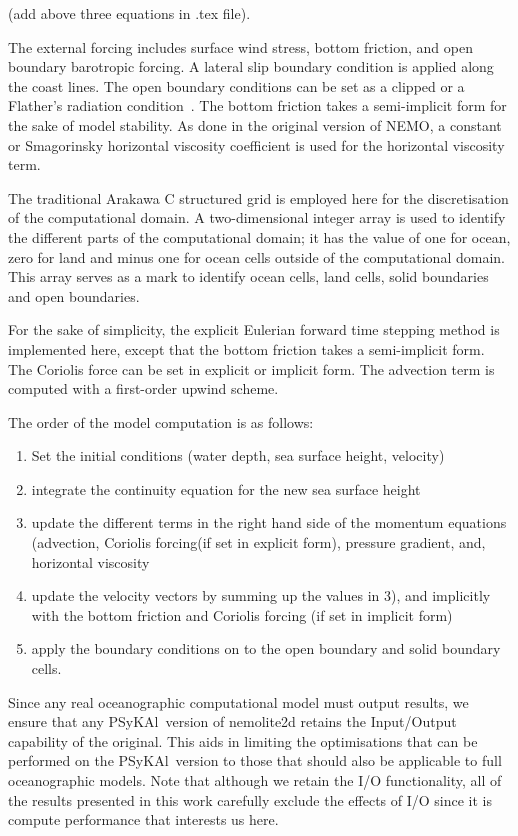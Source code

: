 \documentclass[journal]{IEEEtran}
\newcommand{\psykal}{{PS}y{KA}l\ }
\begin{document}
(add above three equations in .tex file).

The external forcing includes surface wind stress, bottom friction,
and open boundary barotropic forcing. A lateral slip boundary
condition is applied along the coast lines. The open boundary
conditions can be set as a clipped or a Flather's radiation
condition~\cite{flather76}. The bottom friction takes a semi-implicit
form for the sake of model stability. As done in the original version
of NEMO, a constant or Smagorinsky horizontal viscosity coefficient is
used for the horizontal viscosity term.

The traditional Arakawa C structured grid is employed here for the
discretisation of the computational domain. A two-dimensional integer
array is used to identify the different parts of the computational
domain; it has the value of one for ocean, zero for land and minus
one for ocean cells outside of the computational domain. This array
serves as a mark to identify ocean cells, land cells, solid boundaries
and open boundaries.

For the sake of simplicity, the explicit Eulerian forward time
stepping method is implemented here, except that the bottom friction
takes a semi-implicit form.  The Coriolis force can be set in explicit
or implicit form. The advection term is computed with a first-order
upwind scheme.

The order of the model computation is as follows:
\begin{enumerate}
\item Set the initial conditions (water depth, sea surface height, velocity)
\item integrate the continuity equation for the new sea surface height
\item update the different terms in the right hand side of the momentum equations (advection, Coriolis forcing(if set in explicit form), pressure gradient, and, horizontal viscosity
\item update the velocity vectors by summing up the values in 3), and implicitly with the bottom friction and Coriolis forcing (if set in implicit form)
\item apply the boundary conditions on to the open boundary and solid boundary cells.
\end{enumerate}

Since any real oceanographic computational model must output results,
we ensure that any \psykal version of nemolite2d retains the Input/Output
capability of the original. This aids in limiting the optimisations
that can be performed on the \psykal version to those that should also
be applicable to full oceanographic models. Note that although we
retain the I/O functionality, all of the results presented in this work
carefully exclude the effects of I/O since it is compute performance
that interests us here.
\end{document}
